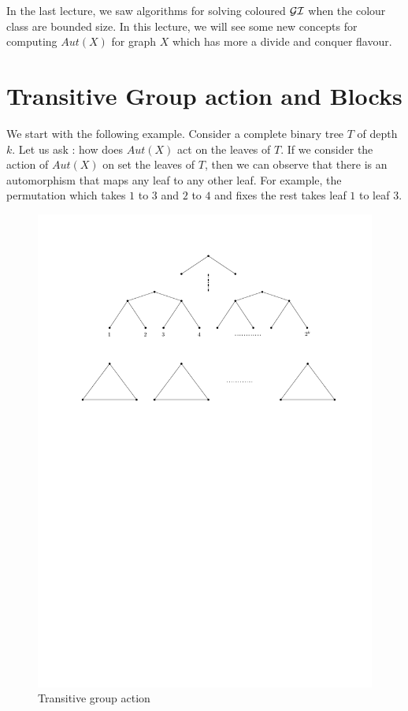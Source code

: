 
In the last lecture, we saw algorithms for solving coloured $\mathcal{GI}$ when the
colour class are bounded size. In this lecture, we will see some new concepts 
for computing $Aut(X)$ for graph $X$ which has more a divide and conquer
flavour.

\section{Transitive Group action and Blocks}
We start with the following example. Consider a complete binary tree $T$ of 
depth $k$. Let us ask : how does $Aut(X)$ act on the leaves of $T$. If we
consider the action of $Aut(X)$ on set the leaves of $T$, then we can
observe that there is an automorphism that maps any leaf to any other leaf.
For example, the permutation which takes $1$ to $3$ and $2$ to $4$ and fixes
the rest takes leaf $1$ to leaf $3$.
\begin{figure}[htp!]
	\centering
	\includegraphics[scale=0.68]{images/transitive}
	\caption{Transitive group action}
	\label{fig:transitive}
\end{figure}

